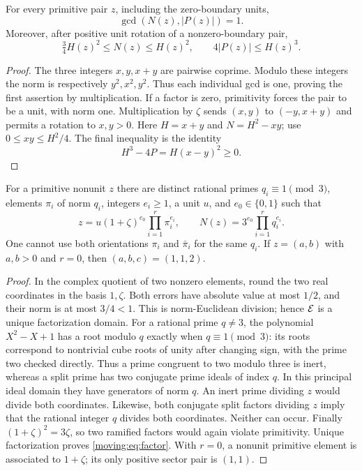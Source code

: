 \begin{lemma}\label{moving:lem:disjoint}
For every primitive pair $z$, including the zero-boundary units,
\[
 \gcd(N(z),|P(z)|)=1.
\]
Moreover, after positive unit rotation of a nonzero-boundary pair,
\begin{equation}\label{moving:eq:geometry}
 \tfrac34H(z)^2\le N(z)\le H(z)^2,
 \qquad 4|P(z)|\le H(z)^3.
\end{equation}
\end{lemma}
\begin{proof}
The three integers $x,y,x+y$ are pairwise coprime. Modulo these integers the norm is respectively $y^2,x^2,y^2$. Thus each individual gcd is one, proving the first assertion by multiplication. If a factor is zero, primitivity forces the pair to be a unit, with norm one.
Multiplication by $\zeta$ sends $(x,y)$ to $(-y,x+y)$ and permits a rotation to $x,y>0$. Here $H=x+y$ and $N=H^2-xy$; use $0\le xy\le H^2/4$. The final inequality is the identity
\[
 H^3-4P=H(x-y)^2\ge0.
\]
\end{proof}

\begin{lemma}\label{moving:lem:factors}
For a primitive nonunit $z$ there are distinct rational primes $q_i\equiv1\pmod3$, elements $\pi_i$ of norm $q_i$, integers $e_i\ge1$, a unit $u$, and $e_0\in\{0,1\}$ such that
\begin{equation}\label{moving:eq:factor}
 z=u(1+\zeta)^{e_0}\prod_{i=1}^{r}\pi_i^{e_i},
 \qquad N(z)=3^{e_0}\prod_{i=1}^{r}q_i^{e_i}.
\end{equation}
One cannot use both orientations $\pi_i$ and $\bar\pi_i$ for the same $q_i$. If $z=(a,b)$ with $a,b>0$ and $r=0$, then $(a,b,c)=(1,1,2)$.
\end{lemma}
\begin{proof}
In the complex quotient of two nonzero elements, round the two real coordinates in the basis $1,\zeta$. Both errors have absolute value at most $1/2$, and their norm is at most $3/4<1$. This is norm-Euclidean division; hence $\mathcal E$ is a unique factorization domain.
For a rational prime $q\ne3$, the polynomial $X^2-X+1$ has a root modulo $q$ exactly when $q\equiv1\pmod3$: its roots correspond to nontrivial cube roots of unity after changing sign, with the prime two checked directly. Thus a prime congruent to two modulo three is inert, whereas a split prime has two conjugate prime ideals of index $q$. In this principal ideal domain they have generators of norm $q$. An inert prime dividing $z$ would divide both coordinates. Likewise, both conjugate split factors dividing $z$ imply that the rational integer $q$ divides both coordinates. Neither can occur.
Finally $(1+\zeta)^2=3\zeta$, so two ramified factors would again violate primitivity. Unique factorization proves \eqref{moving:eq:factor}. With $r=0$, a nonunit primitive element is associated to $1+\zeta$; its only positive sector pair is $(1,1)$.
\end{proof}

